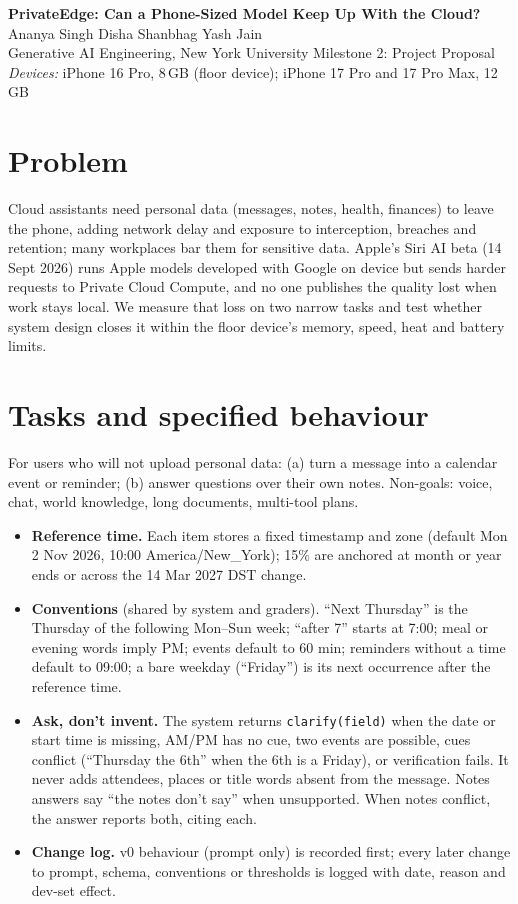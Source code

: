 \documentclass[10pt,letterpaper]{article}
\begin{document}
\begin{center}
{\fontsize{15}{18}\selectfont\bfseries PrivateEdge: Can a Phone-Sized Model Keep Up With the Cloud?}\\[4pt]
Ananya Singh \quad Disha Shanbhag \quad Yash Jain\\[1pt]
Generative AI Engineering, New York University \quad Milestone 2: Project Proposal\\[1pt]
\textit{Devices:} iPhone 16 Pro, 8\,GB (floor device); iPhone 17 Pro and 17 Pro Max, 12\,GB
\end{center}
\vspace{-4pt}

\section{Problem}
Cloud assistants need personal data (messages, notes, health, finances) to leave the phone, adding network delay and exposure to interception, breaches and retention; many workplaces bar them for sensitive data. Apple's Siri AI beta (14 Sept 2026) runs Apple models developed with Google on device but sends harder requests to Private Cloud Compute, and no one publishes the quality lost when work stays local. We measure that loss on two narrow tasks and test whether system design closes it within the floor device's memory, speed, heat and battery limits.

\section{Tasks and specified behaviour}
For users who will not upload personal data: (a) turn a message into a calendar event or reminder; (b) answer questions over their own notes. Non-goals: voice, chat, world knowledge, long documents, multi-tool plans.
\begin{itemize}
  \item \textbf{Reference time.} Each item stores a fixed timestamp and zone (default Mon 2 Nov 2026, 10:00 America/New\_York); 15\% are anchored at month or year ends or across the 14 Mar 2027 DST change.
  \item \textbf{Conventions} (shared by system and graders). ``Next Thursday'' is the Thursday of the following Mon--Sun week; ``after 7'' starts at 7:00; meal or evening words imply PM; events default to 60 min; reminders without a time default to 09:00; a bare weekday (``Friday'') is its next occurrence after the reference time.
  \item \textbf{Ask, don't invent.} The system returns \texttt{clarify(field)} when the date or start time is missing, AM/PM has no cue, two events are possible, cues conflict (``Thursday the 6th'' when the 6th is a Friday), or verification fails. It never adds attendees, places or title words absent from the message. Notes answers say ``the notes don't say'' when unsupported. When notes conflict, the answer reports both, citing each.
  \item \textbf{Change log.} v0 behaviour (prompt only) is recorded first; every later change to prompt, schema, conventions or thresholds is logged with date, reason and dev-set effect.
\end{itemize}
\end{document}
